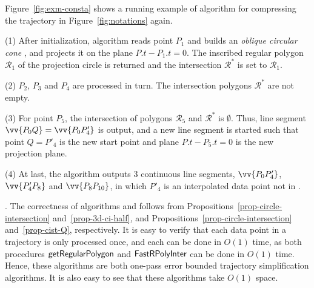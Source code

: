 \begin{example}
\label{exm-alg-conesta}
Figure~\ref{fig:exm-consta}  shows a running example of algorithm \cista for compressing the trajectory  in Figure~\ref{fig:notations} again.


\sstab (1) After initialization, algorithm \cista  reads point $P_1$ and builds an \emph{oblique circular cone} , and projects it on the plane $P.t-P_1.t=0$. The inscribed regular polygon $\mathcal{R}_1$ of the projection circle is returned and the intersection $\mathcal{R}^*$ is set to $\mathcal{R}_1$.

\sstab (2) $P_2$, $P_3$ and $P_4$ are processed in turn. The intersection polygons $\mathcal{R}^*$ are not empty.

\sstab (3) For point $P_5$, the intersection of polygons $\mathcal{R}_5$ and $\mathcal{R}^*$ is $\emptyset$. Thus, line segment $\vv{P_0Q} =\vv{P_0P'_4}$ is output, and a new line segment is started such that point $Q=P'_4$ is the new start point and plane $P.t-P_5.t=0$ is the new projection plane.

\sstab (4) At last, the algorithm outputs 3 continuous line segments, \ie $\vv{P_0P'_4}$, $\vv{P'_4P_8}$ and $\vv{P_8P_{10}}$, in which $P'_4$ is an interpolated data point not in . \eop
\end{example}




\vspace{.5ex}
.
%
The correctness of algorithms \cist and \cista follows from Propositions~\ref{prop-circle-intersection} and~\ref{prop-3d-ci-half}, and Propositions~\ref{prop-circle-intersection} and~\ref{prop-cist-Q}, respectively.
%
It is easy to verify that each data point in a trajectory is only processed once, and each can be done in $O(1)$ time,
as both procedures  ${\mathsf{getRegularPolygon}}$ and ${\mathsf{FastRPolyInter}}$ can be done in $O(1)$ time.
Hence, these algorithms are both one-pass error bounded trajectory simplification algorithms.
It is also easy to see that these algorithms take $O(1)$ space.




